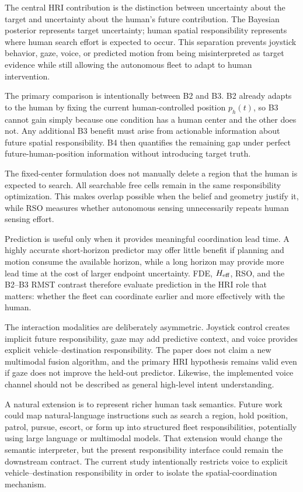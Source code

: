 \documentclass[conference]{IEEEtran}
\begin{document}
The central HRI contribution is the distinction between uncertainty about the
target and uncertainty about the human's future contribution. The Bayesian
posterior represents target uncertainty; human spatial responsibility
represents where human search effort is expected to occur. This separation
prevents joystick behavior, gaze, voice, or predicted motion from being
misinterpreted as target evidence while still allowing the autonomous fleet to
adapt to human intervention.

The primary comparison is intentionally between B2 and B3. B2 already adapts
to the human by fixing the current human-controlled position $p_h(t)$, so B3
cannot gain simply because one condition has a human center and the other does
not. Any additional B3 benefit must arise from actionable information about
future spatial responsibility. B4 then quantifies the remaining gap under
perfect future-human-position information without introducing target truth.

The fixed-center formulation does not manually delete a region that the human
is expected to search. All searchable free cells remain in the same
responsibility optimization. This makes overlap possible when the belief and
geometry justify it, while RSO measures whether autonomous sensing unnecessarily
repeats human sensing effort.

Prediction is useful only when it provides meaningful coordination lead time.
A highly accurate short-horizon predictor may offer little benefit if planning
and motion consume the available horizon, while a long horizon may provide more
lead time at the cost of larger endpoint uncertainty. FDE, $H_{\rm eff}$, RSO,
and the B2--B3 RMST contrast therefore evaluate prediction in the HRI role that
matters: whether the fleet can coordinate earlier and more effectively with the
human.

The interaction modalities are deliberately asymmetric. Joystick control
creates implicit future responsibility, gaze may add predictive context, and
voice provides explicit vehicle--destination responsibility. The paper does not
claim a new multimodal fusion algorithm, and the primary HRI hypothesis remains
valid even if gaze does not improve the held-out predictor. Likewise, the
implemented voice channel should not be described as general high-level intent
understanding.

A natural extension is to represent richer human task semantics. Future work
could map natural-language instructions such as search a region, hold position,
patrol, pursue, escort, or form up into structured fleet responsibilities,
potentially using large language or multimodal models. That extension would
change the semantic interpreter, but the present responsibility interface could
remain the downstream contract. The current study intentionally restricts
voice to explicit vehicle--destination responsibility in order to isolate the
spatial-coordination mechanism.
\end{document}
